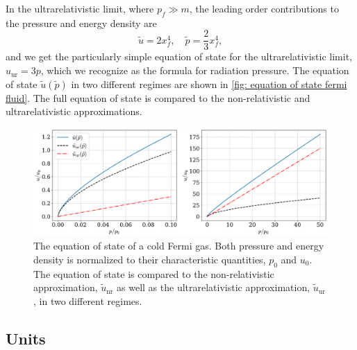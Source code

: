 In the ultrarelativistic limit, where $p_f \gg m$, the leading order contributions to the pressure and energy density are
%
\begin{equation}
    \tilde u = 2 x_f^4, \quad \tilde p = \frac{2}{3} x_f^4, 
\end{equation}
%
and we get the particularly simple equation of state for the ultrarelativistic limit, $ u_{\mathrm{ur}} = 3 p $, which we recognize as the formula for radiation pressure.
The equation of state $\tilde u(\tilde p)$ in two different regimes are shown in \autoref{fig: equation of state fermi fluid}.
The full equation of state is compared to the non-relativistic and ultrarelativistic approximations.

\begin{figure}[h]
    \centering
    \includegraphics[width=\textwidth]{../scripts/figurer/fermi_eos.pdf}
    \caption{The equation of state of a cold Fermi gas. Both pressure and energy density is normalized to their characteristic quantities, $p_0$ and $u_0$. The equation of state is compared to the non-relativistic approximation, $\tilde u_{\mathrm{nr}}$ as well as the ultrarelativistic approximation, $\tilde u_{\mathrm{ur}}$, in two different regimes.}
    \label{fig: equation of state fermi fluid}
\end{figure}




\subsection{Units}

